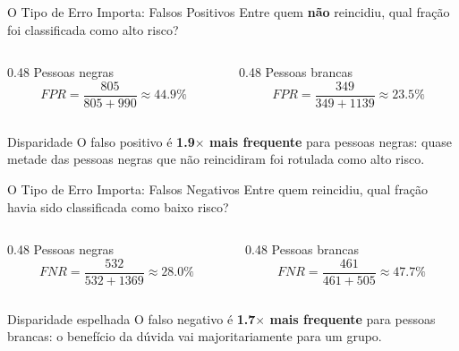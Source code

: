 \documentclass[aspectratio=169,xcolor=dvipsnames]{beamer}
\begin{document}
  \begin{frame}{O Tipo de Erro Importa: Falsos Positivos}
    \centering
    Entre quem \textbf{não} reincidiu, qual fração foi classificada como alto risco?

    \vspace{0.6em}
    \begin{columns}
      \begin{column}{0.48\textwidth}
        \centering
        Pessoas negras
        \[
          FPR = \frac{805}{805 + 990} \approx 44.9\%
        \]
      \end{column}
      \begin{column}{0.48\textwidth}
        \centering
        Pessoas brancas
        \[
          FPR = \frac{349}{349 + 1139} \approx 23.5\%
        \]
      \end{column}
    \end{columns}

    \vspace{0.8em}
    \begin{alertblock}{Disparidade}
      O falso positivo é \textbf{1.9$\times$ mais frequente} para pessoas negras: quase metade das pessoas negras que não reincidiram foi rotulada como alto risco.
    \end{alertblock}
  \end{frame}

  \begin{frame}{O Tipo de Erro Importa: Falsos Negativos}
    \centering
    Entre quem reincidiu, qual fração havia sido classificada como baixo risco?

    \vspace{0.6em}
    \begin{columns}
      \begin{column}{0.48\textwidth}
        \centering
        Pessoas negras
        \[
          FNR = \frac{532}{532 + 1369} \approx 28.0\%
        \]
      \end{column}
      \begin{column}{0.48\textwidth}
        \centering
        Pessoas brancas
        \[
          FNR = \frac{461}{461 + 505} \approx 47.7\%
        \]
      \end{column}
    \end{columns}

    \vspace{0.8em}
    \begin{alertblock}{Disparidade espelhada}
      O falso negativo é \textbf{1.7$\times$ mais frequente} para pessoas brancas: o benefício da dúvida vai majoritariamente para um grupo.
    \end{alertblock}
  \end{frame}
\end{document}
